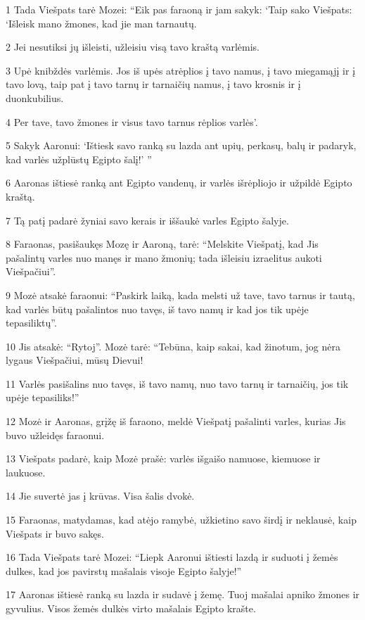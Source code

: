 \par 1 Tada Viešpats tarė Mozei: “Eik pas faraoną ir jam sakyk: ‘Taip sako Viešpats: ‘Išleisk mano žmones, kad jie man tarnautų. 
\par 2 Jei nesutiksi jų išleisti, užleisiu visą tavo kraštą varlėmis. 
\par 3 Upė knibždės varlėmis. Jos iš upės atrėplios į tavo namus, į tavo miegamąjį ir į tavo lovą, taip pat į tavo tarnų ir tarnaičių namus, į tavo krosnis ir į duonkubilius. 
\par 4 Per tave, tavo žmones ir visus tavo tarnus rėplios varlės’. 
\par 5 Sakyk Aaronui: ‘Ištiesk savo ranką su lazda ant upių, perkasų, balų ir padaryk, kad varlės užplūstų Egipto šalį!’ ” 
\par 6 Aaronas ištiesė ranką ant Egipto vandenų, ir varlės išrėpliojo ir užpildė Egipto kraštą. 
\par 7 Tą patį padarė žyniai savo kerais ir iššaukė varles Egipto šalyje. 
\par 8 Faraonas, pasišaukęs Mozę ir Aaroną, tarė: “Melskite Viešpatį, kad Jis pašalintų varles nuo manęs ir mano žmonių; tada išleisiu izraelitus aukoti Viešpačiui”. 
\par 9 Mozė atsakė faraonui: “Paskirk laiką, kada melsti už tave, tavo tarnus ir tautą, kad varlės būtų pašalintos nuo tavęs, iš tavo namų ir kad jos tik upėje tepasiliktų”. 
\par 10 Jis atsakė: “Rytoj”. Mozė tarė: “Tebūna, kaip sakai, kad žinotum, jog nėra lygaus Viešpačiui, mūsų Dievui! 
\par 11 Varlės pasišalins nuo tavęs, iš tavo namų, nuo tavo tarnų ir tarnaičių, jos tik upėje tepasiliks!” 
\par 12 Mozė ir Aaronas, grįžę iš faraono, meldė Viešpatį pašalinti varles, kurias Jis buvo užleidęs faraonui. 
\par 13 Viešpats padarė, kaip Mozė prašė: varlės išgaišo namuose, kiemuose ir laukuose. 
\par 14 Jie suvertė jas į krūvas. Visa šalis dvokė. 
\par 15 Faraonas, matydamas, kad atėjo ramybė, užkietino savo širdį ir neklausė, kaip Viešpats ir buvo sakęs. 
\par 16 Tada Viešpats tarė Mozei: “Liepk Aaronui ištiesti lazdą ir suduoti į žemės dulkes, kad jos pavirstų mašalais visoje Egipto šalyje!” 
\par 17 Aaronas ištiesė ranką su lazda ir sudavė į žemę. Tuoj mašalai apniko žmones ir gyvulius. Visos žemės dulkės virto mašalais Egipto krašte. 
